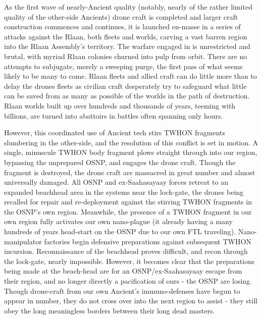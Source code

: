 As the first wave of nearly-Ancient quality (notably, nearly of the
rather limited quality of the other-side Ancients) drone craft is
completed and larger craft construction commences and continues, it is
launched en-masse in a series of attacks against the Rlaan, both
fleets and worlds, carving a vast barren region into the Rlaan
Assembly's territory. The warfare engaged in is unrestricted and
brutal, with myriad Rlaan colonies churned into pulp from orbit. There
are no attempts to subjugate, merely a sweeping purge, the first pass
of what seems likely to be many to come. Rlaan fleets and allied craft
can do little more than to delay the drones fleets as civilian craft
desperately try to safeguard what little can be saved from as many as
possible of the worlds in the path of destruction. Rlaan worlds built
up over hundreds and thousands of years, teeming with billions, are
turned into abattoirs in battles often spanning only hours.

However, this coordinated use of Ancient tech stirs TWHON
fragments slumbering in the other-side, and the resolution of this
conflict is set in motion. A single, minuscule TWHON body fragment
plows straight through into our region, bypassing the unprepared OSNP,
and engages the drone craft. Though the fragment is destroyed, the
drone craft are massacred in great number and almost universally
damaged. All OSNP and ex-Saahasayaay forces retreat to an expanded
beachhead area in the systems near the lock-gate, the drones being
recalled for repair and re-deployment against the stirring TWHON
fragments in the OSNP's own region. Meanwhile, the presence of a TWHON
fragment in our own region fully activates our own nano-plague (it
already having a many hundreds of years head-start on the OSNP due to
our own FTL traveling). Nano-manipulator factories begin defensive
preparations against subsequent TWHON incursion. Reconnaissance of the
beachhead proves difficult, and recon through the lock-gate, nearly
impossible. However, it becomes clear that the preparations being made
at the beach-head are for an OSNP/ex-Saahasayaay escape from their
region, and no longer directly a pacification of ours - the OSNP are
losing. Though drone-craft from our own Ancient's immuno-defenses have
begun to appear in number, they do not cross over into the next region
to assist - they still obey the long meaningless borders between their
long dead masters.


